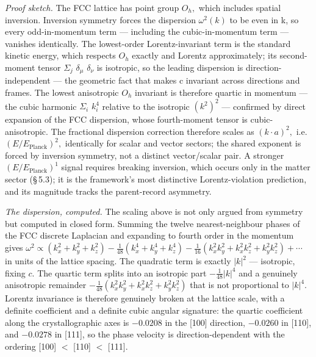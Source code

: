 \documentclass[11pt,oneside]{report}
\theoremstyle{definition}
\theoremstyle{remark}
\begin{document}
\emph{Proof sketch.} The FCC lattice has point group \ensuremath{O_{h},} which
includes spatial inversion. Inversion symmetry forces the dispersion
\ensuremath{\omega ^{2}(k)} to be even in k, so every odd-in-momentum term --- including
the cubic-in-momentum term --- vanishes identically. The lowest-order
Lorentz-invariant term is the standard kinetic energy, which respects
\ensuremath{O_{h}} exactly and Lorentz approximately; its second-moment tensor \ensuremath{\Sigma_{j}}
\ensuremath{\delta_{\mu}} \ensuremath{\delta_{\nu}} is isotropic, so the leading dispersion is
direction-independent --- the geometric fact that makes c invariant
across directions and frames. The lowest anisotropic \ensuremath{O_{h}} invariant is
therefore quartic in momentum --- the cubic harmonic \ensuremath{\Sigma_{i}} \ensuremath{k_{i}^{4}}
relative to the isotropic \ensuremath{(k^{2})^{2}} --- confirmed by direct
expansion of the FCC dispersion, whose fourth-moment tensor is
cubic-anisotropic. The fractional dispersion correction therefore scales
as \ensuremath{(k\cdot a)^{2},} i.e. \ensuremath{(E/E_{\mathrm{Planck}})^{2},} identically for scalar and
vector sectors; the shared exponent is forced by inversion symmetry, not
a distinct vector/scalar pair. A stronger \ensuremath{(E/E_{\mathrm{Planck}})^{1}} signal
requires breaking inversion, which occurs only in the matter sector
(\S\,5.3); it is the framework's most distinctive Lorentz-violation
prediction, and its magnitude tracks the parent-record asymmetry.

\emph{The dispersion, computed.} The scaling above is not only argued from
symmetry but computed in closed form. Summing the twelve nearest-neighbour phases
of the FCC discrete Laplacian and expanding to fourth order in the momentum gives
\ensuremath{\omega^{2} \propto (k_{x}^{2}+k_{y}^{2}+k_{z}^{2}) - \tfrac{1}{48}(k_{x}^{4}+k_{y}^{4}+k_{z}^{4}) - \tfrac{1}{16}(k_{x}^{2}k_{y}^{2}+k_{x}^{2}k_{z}^{2}+k_{y}^{2}k_{z}^{2}) + \cdots}
in units of the lattice spacing. The quadratic term is exactly \ensuremath{|k|^{2}} ---
isotropic, fixing \ensuremath{c}. The quartic term splits into an isotropic part
\ensuremath{-\tfrac{1}{48}|k|^{4}} and a genuinely anisotropic remainder
\ensuremath{-\tfrac{1}{48}(k_{x}^{2}k_{y}^{2}+k_{x}^{2}k_{z}^{2}+k_{y}^{2}k_{z}^{2})} that is
not proportional to \ensuremath{|k|^{4}}. Lorentz invariance is therefore genuinely broken
at the lattice scale, with a definite coefficient and a definite cubic angular
signature: the quartic coefficient along the crystallographic axes is
\ensuremath{-0.0208} in the [100] direction, \ensuremath{-0.0260} in [110], and \ensuremath{-0.0278} in [111], so
the phase velocity is direction-dependent with the ordering [100] \ensuremath{<} [110] \ensuremath{<}
[111].
\end{document}
